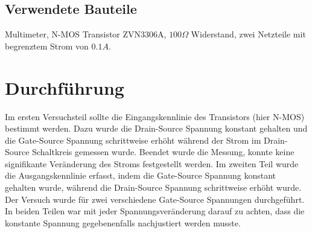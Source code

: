 \documentclass[11pt, a4paper]{article}
\begin{document}
\subsection*{Verwendete Bauteile}
Multimeter, N-MOS Transistor ZVN3306A, $100 \Omega$ Widerstand, zwei Netzteile mit begrenztem Strom von $0.1 A$.
\section*{Durchführung}
Im ersten Versuchsteil sollte die Eingangskennlinie des Transistors (hier N-MOS) bestimmt werden. Dazu wurde die Drain-Source Spannung konstant gehalten und die Gate-Source Spannung schrittweise erhöht während der Strom im Drain-Source Schaltkreis gemessen wurde. Beendet wurde die Messung, konnte keine signifikante Veränderung des Stroms festgestellt werden.
Im zweiten Teil wurde die Ausgangskennlinie erfasst, indem die Gate-Source Spannung konstant gehalten wurde, während die Drain-Source Spannung schrittweise erhöht wurde. Der Versuch wurde für zwei verschiedene Gate-Source Spannungen durchgeführt.
In beiden Teilen war mit jeder Spannungsveränderung darauf zu achten, dass die konstante Spannung gegebenenfalls nachjustiert werden musste.
\end{document}
